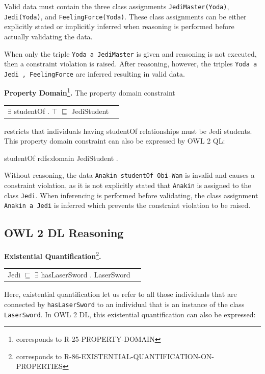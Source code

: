 \documentclass{llncs}
\newcommand{\ms}[1]{\texttt{#1}}
\newenvironment{DL}{
  \begin{tabular}{r l}

}{
  \end{tabular}
  \linebreak
}
\begin{document}
Valid data must contain the three class assignments \ms{JediMaster(Yoda)}, \ms{Jedi(Yoda)}, and \ms{FeelingForce(Yoda)}.
These class assignments can be either explicitly stated or implicitly inferred when reasoning is performed before actually validating the data.

When only the triple \ms{Yoda a JediMaster} is given and reasoning is not executed, then a constraint violation is raised.
After reasoning, however, the triples \ms{Yoda a Jedi , FeelingForce} are inferred resulting in valid data. 

\textbf{Property Domain}\footnote{corresponds to R-25-PROPERTY-DOMAIN}\textbf{.}
The property domain constraint

\begin{DL}
$\exists$ studentOf . $\top$ $\sqsubseteq$ JediStudent \\
\end{DL}

restricts that individuals having studentOf relationships must be Jedi students.
This property domain constraint can also be expressed by OWL 2 QL:

\begin{ex}
studentOf rdfs:domain JediStudent .
\end{ex}

Without reasoning, the data \ms{Anakin studentOf Obi-Wan} is invalid and causes a constraint violation, as it is not explicitly stated that \ms{Anakin} is assigned to the class \ms{Jedi}. 
When inferencing is performed before validating, the class assignment \ms{Anakin a Jedi} is inferred which prevents the constraint violation to be raised.

\subsection{OWL 2 DL Reasoning}

\textbf{Existential Quantification}\footnote{corresponds to R-86-EXISTENTIAL-QUANTIFICATION-ON-PROPERTIES}\textbf{.}

\begin{center}
\begin{DL}
Jedi $\sqsubseteq$ $\exists$ hasLaserSword . LaserSword
\end{DL}
\end{center}

Here, existential quantification let us refer to all those individuals that are connected by \ms{hasLaserSword} to an individual that is an instance of the class \ms{LaserSword}.
In OWL 2 DL, this existential quantification can also be expressed:
\end{document}

